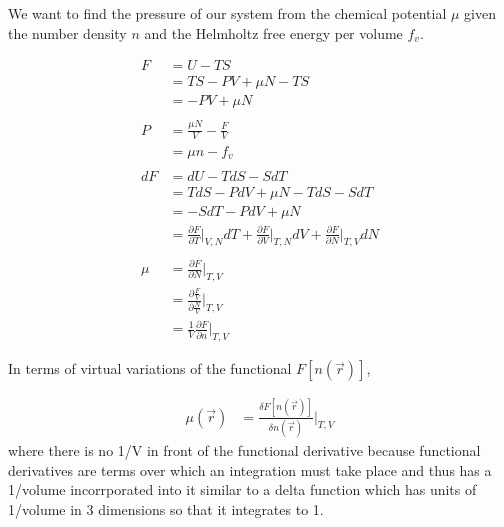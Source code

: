 \documentclass[double,12pt]{revtex4-2}
\begin{document}
We want to find the pressure of our system from the chemical potential 
$\mu$ given the number density $n$ and the Helmholtz free energy per 
volume $f_v$. 

\begin{align}
	F &= U - TS  \\
	  &= TS -PV + \mu N - TS  \\
	  &= -PV + \mu N  \\ \nonumber\\
%
	P &= \frac{\mu N}{V} - \frac{F}{V} \\
	  &= \mu n - f_v   \\ \nonumber\\
%
	dF &= dU - TdS -SdT \\
	   &= TdS - PdV + \mu N  - TdS -SdT\\
	   &=  -SdT - PdV + \mu N \\
	   &= \frac{\partial F}{\partial T}\bigg|_{V,N}dT 
	       + \frac{\partial F}{\partial V}\bigg|_{T,N}dV 
	       + \frac{\partial F}{\partial N}\bigg|_{T,V}dN \\ \nonumber\\
%
    \mu &= \frac{\partial F}{\partial N}\bigg|_{T,V} \\
        &= \frac{\partial \frac{F}{V}}{\partial \frac{N}{V}}\bigg|_{T,V}\\
        &= \frac{1}{V}\frac{\partial F}{\partial n}\bigg|_{T,V}        
\end{align}

In terms of virtual variations of the functional $F[n(\vec r)]$, 

\begin{align}
  \mu(\vec r) &= \frac{\delta F[n(\vec r)]}{\delta n(\vec r)}\bigg|_{T,V}
\end{align}
where there is no 1/V in front of the functional derivative because 
functional derivatives are terms
over which an integration must take place and thus has a 1/volume 
incorrporated into it similar to a delta function which
has units of 1/volume in 3 dimensions so that it integrates to 1.
\end{document}

